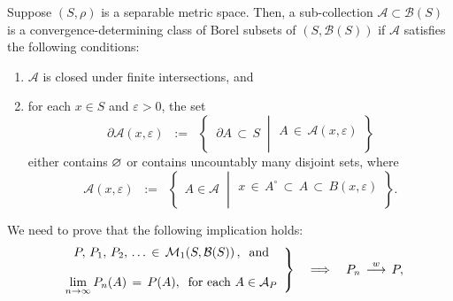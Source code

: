 \begin{theorem}
\label{SufficientConditionConvergenceDeterminingClass}
\mbox{}
\vskip 0.1cm
\noindent
Suppose $\left(S,\rho\right)$ is a {\color{red}separable} metric space.
Then, a sub-collection $\mathcal{A} \subset \mathcal{B}(S)$ is a
convergence-determining class of Borel subsets of
$\left(S,\mathcal{B}(S)\right)$ if $\mathcal{A}$ satisfies the following conditions:
\begin{enumerate}
\item	$\mathcal{A}$ is closed under finite intersections, and
\item	for each $x \in S$ and $\varepsilon > 0$, the set
		\begin{equation*}
		\partial\mathcal{A}(x,\varepsilon)
		\;\; := \;\;
		\left\{\;\;
		\partial A \,\subset\, S
		\;\;\left\vert\;
		\begin{array}{c}
			\\
			A \,\in\, \mathcal{A}(x,\varepsilon)
			\\ \\
		\end{array}
		\right.
		\right\}
		\end{equation*}
		either contains $\varnothing$ or contains uncountably many disjoint sets,
		where
		\begin{equation*}
		\mathcal{A}(x,\varepsilon)
		\;\; := \;\;
		\left\{\;\,
		A \in \mathcal{A}
		\;\;\left\vert\;
		\begin{array}{c}
			\\
			x \,\in\, A^{\circ} \,\subset\, A \,\subset\, B(x,\varepsilon)
			\\ \\
		\end{array}
		\right.
		\right\}.
		\end{equation*}		
\end{enumerate}
\end{theorem}
\proof
We need to prove that the following implication holds:
\begin{equation*}
\left.
\begin{array}{c}
	P,\,P_{1},\,P_{2},\,\ldots\,\in\,\mathcal{M}_{1}\!\left(S,\mathcal{B}(S)\right),\;\;\textnormal{and}
	\\ \\
	\underset{n\rightarrow\infty}{\lim}\,P_{n}(A) \,=\, P(A),\;\;\textnormal{for each $A \in \mathcal{A}_{P}$}
\end{array}
\right\}
\quad\Longrightarrow\quad
P_{n} \,\overset{w}{\longrightarrow}\, P,
\end{equation*}
